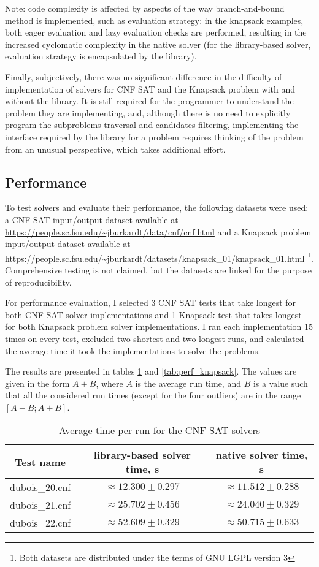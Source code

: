 Note: code complexity is affected by aspects of the way branch-and-bound method
is implemented, such as evaluation strategy: in the knapsack examples, both eager evaluation
and lazy evaluation checks are performed, resulting in the increased cyclomatic complexity
in the native solver (for the library-based solver, evaluation strategy is encapsulated
by the library).

Finally, subjectively, there was no significant difference in the difficulty of
implementation of solvers for CNF SAT and the Knapsack problem with and without the library.
It is still required for the programmer to understand the problem they are implementing,
and, although there is no need to explicitly program the subproblems traversal and candidates
filtering, implementing the interface required by the library for a problem requires thinking
of the problem from an unusual perspective, which takes additional effort.

\subsection{Performance}

To test solvers and evaluate their performance, the following datasets were used:
a CNF SAT input/output dataset available at
\url{https://people.sc.fsu.edu/~jburkardt/data/cnf/cnf.html}
and a Knapsack problem input/output dataset available at
\url{https://people.sc.fsu.edu/~jburkardt/datasets/knapsack_01/knapsack_01.html}
\footnote{Both datasets are distributed under the terms of GNU LGPL version 3}.
Comprehensive testing is not claimed, but the datasets are linked for the purpose of
reproducibility.

For performance evaluation, I selected 3 CNF SAT tests that take longest for
both CNF SAT solver implementations and 1 Knapsack test that takes longest for both
Knapsack problem solver implementations.
I ran each implementation 15 times on every test, excluded two shortest and two longest
runs, and calculated the average time it took the implementations to solve the problems.

The results are presented in tables \ref{tab:perf_cnfsat} and \ref{tab:perf_knapsack}.
The values are given in the form $A\pm B$, where $A$ is the average run time,
and $B$ is a value such that all the considered run times (except for the four outliers) are in
the range $[A - B; A + B]$.

\begin{table}[h]
 \centering
 \caption{Average time per run for the CNF SAT solvers}
 \label{tab:perf_cnfsat}

 \begin{tabular}{|ccc|}
  \hline
  Test name & library-based solver time, s & native solver time, s \\
  \hline
  dubois\_20.cnf & $\approx 12.300\pm 0.297$ & $\approx 11.512\pm 0.288$ \\
  dubois\_21.cnf & $\approx 25.702\pm 0.456$ & $\approx 24.040\pm 0.329$ \\
  dubois\_22.cnf & $\approx 52.609\pm 0.329$ & $\approx 50.715\pm 0.633$ \\
  \hline
 \end{tabular}
\end{table}


